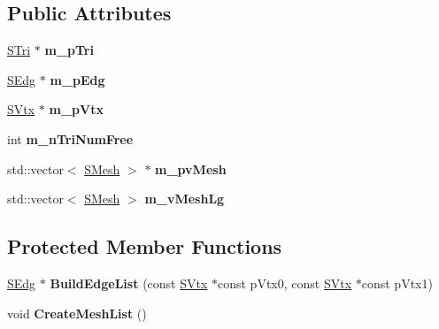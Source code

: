 \subsection*{Public Attributes}
\begin{DoxyCompactItemize}
\item 
\hypertarget{class_c_object_a5366fdd640b6eb3a0fdc3d994845eaa4}{\hyperlink{struct_s_tri}{S\+Tri} $\ast$ {\bfseries m\+\_\+p\+Tri}}\label{class_c_object_a5366fdd640b6eb3a0fdc3d994845eaa4}

\item 
\hypertarget{class_c_object_af00eab1f95249137a215fd467e2dd6dd}{\hyperlink{struct_s_edg}{S\+Edg} $\ast$ {\bfseries m\+\_\+p\+Edg}}\label{class_c_object_af00eab1f95249137a215fd467e2dd6dd}

\item 
\hypertarget{class_c_object_a398b52771486c89da0799d9e39e75964}{\hyperlink{struct_s_vtx}{S\+Vtx} $\ast$ {\bfseries m\+\_\+p\+Vtx}}\label{class_c_object_a398b52771486c89da0799d9e39e75964}

\item 
\hypertarget{class_c_object_a68cabe2be945cc9f8a6782323fa0c2af}{int {\bfseries m\+\_\+n\+Tri\+Num\+Free}}\label{class_c_object_a68cabe2be945cc9f8a6782323fa0c2af}

\item 
\hypertarget{class_c_object_a5fd57b73a3922afb02861089291ae2f1}{std\+::vector$<$ \hyperlink{struct_s_mesh}{S\+Mesh} $>$ $\ast$ {\bfseries m\+\_\+pv\+Mesh}}\label{class_c_object_a5fd57b73a3922afb02861089291ae2f1}

\item 
\hypertarget{class_c_object_a6ee20130d557b96e88d750aeb5f5e135}{std\+::vector$<$ \hyperlink{struct_s_mesh}{S\+Mesh} $>$ {\bfseries m\+\_\+v\+Mesh\+Lg}}\label{class_c_object_a6ee20130d557b96e88d750aeb5f5e135}

\end{DoxyCompactItemize}
\subsection*{Protected Member Functions}
\begin{DoxyCompactItemize}
\item 
\hypertarget{class_c_object_a7924ae89890cde7c8a6f2914618c1179}{\hyperlink{struct_s_edg}{S\+Edg} $\ast$ {\bfseries Build\+Edge\+List} (const \hyperlink{struct_s_vtx}{S\+Vtx} $\ast$const p\+Vtx0, const \hyperlink{struct_s_vtx}{S\+Vtx} $\ast$const p\+Vtx1)}\label{class_c_object_a7924ae89890cde7c8a6f2914618c1179}

\item 
\hypertarget{class_c_object_a99d326e88e66e76490d5b009ac6415bb}{void {\bfseries Create\+Mesh\+List} ()}\label{class_c_object_a99d326e88e66e76490d5b009ac6415bb}

\end{DoxyCompactItemize}

